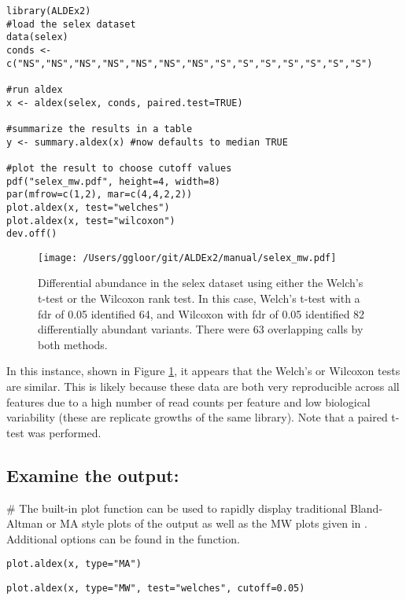 \documentclass[11pt]{amsart}
\begin{document}
\begin{verbatim}
library(ALDEx2)
#load the selex dataset
data(selex)
conds <- c("NS","NS","NS","NS","NS","NS","NS","S","S","S","S","S","S","S")

#run aldex
x <- aldex(selex, conds, paired.test=TRUE)

#summarize the results in a table
y <- summary.aldex(x) #now defaults to median TRUE

#plot the result to choose cutoff values
pdf("selex_mw.pdf", height=4, width=8)
par(mfrow=c(1,2), mar=c(4,4,2,2))
plot.aldex(x, test="welches")
plot.aldex(x, test="wilcoxon")
dev.off()
\end{verbatim}
\begin{figure}[!h]
\begin{center}
\texttt{[image: /Users/ggloor/git/ALDEx2/manual/selex\_mw.pdf]}
\caption{Differential abundance in the selex dataset using either the Welch's t-test or the Wilcoxon rank test. In this case, Welch's t-test with a fdr of 0.05 identified 64, and Wilcoxon with fdr of 0.05 identified 82 differentially abundant variants. There were 63 overlapping calls by both methods. }
\label{selex}
\end{center}
\end{figure}

\vspace{12pt}
In this instance,  shown in Figure \ref{selex}, it appears that the Welch's or Wilcoxon tests  are similar. This is likely because these data are both very reproducible across all features due to a high number of read counts per feature and low biological variability (these are replicate growths of the same library). Note that a paired t-test was performed.

\subsection*{Examine the output:}
\noindent\#  The built-in plot function can be used to rapidly display traditional Bland-Altman or MA style plots of the output as well as the MW plots given in \cite{fernandes:2013}. Additional options can be found in the function.\\
\noindent\begin{verbatim}plot.aldex(x, type="MA")\end{verbatim}
\noindent\begin{verbatim}plot.aldex(x, type="MW", test="welches", cutoff=0.05)\end{verbatim}
\end{document}
